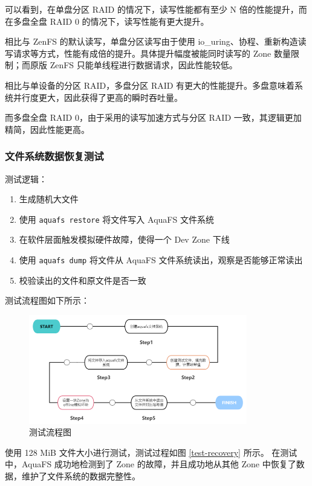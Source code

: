 可以看到，在单盘分区 RAID 的情况下，读写性能都有至少 N 倍的性能提升，而在多盘全盘 RAID 0 的情况下，读写性能有更大提升。

相比与 ZenFS 的默认读写，单盘分区读写由于使用 io\_uring、协程、重新构造读写请求等方式，性能有成倍的提升。具体提升幅度被能同时读写的 Zone 数量限制；而原版 ZenFS 只能单线程进行数据请求，因此性能较低。

相比与单设备的分区 RAID，多盘分区 RAID 有更大的性能提升。多盘意味着系统并行度更大，因此获得了更高的瞬时吞吐量。

而多盘全盘 RAID 0，由于采用的读写加速方式与分区 RAID 一致，其逻辑更加精简，因此性能更高。

\subsubsection{文件系统数据恢复测试}

测试逻辑：

\begin{enumerate}
  \item 生成随机大文件
  \item 使用 \verb|aquafs restore| 将文件写入 AquaFS 文件系统
  \item 在软件层面触发模拟硬件故障，使得一个 Dev Zone 下线
  \item 使用 \verb|aquafs dump| 将文件从 AquaFS 文件系统读出，观察是否能够正常读出
  \item 校验读出的文件和原文件是否一致
\end{enumerate}

测试流程图如下所示：
\begin{figure}[htbp]
  \centering
  \includegraphics[width=0.85\textwidth]{fig/recovery_logic}
  \caption{ 测试流程图 }
  \label{recovery_logic}
\end{figure}

使用 128 MiB 文件大小进行测试，测试过程如图 \ref{test-recovery} 所示。
在测试中，AquaFS 成功地检测到了 Zone 的故障，并且成功地从其他 Zone 中恢复了数据，维护了文件系统的数据完整性。

